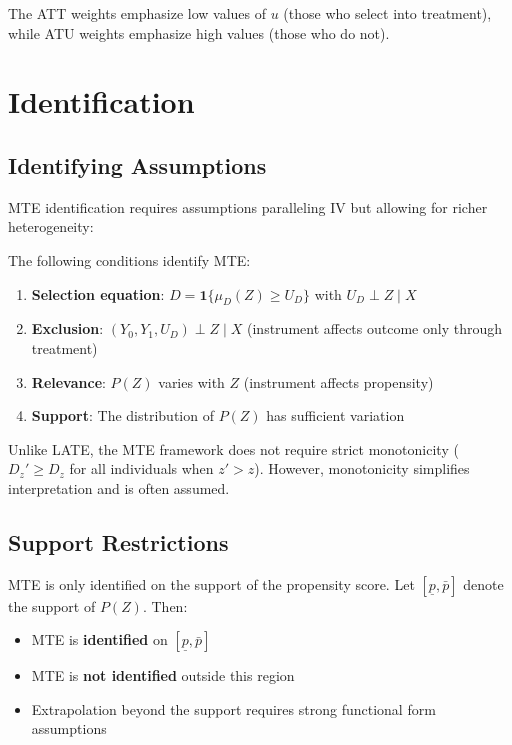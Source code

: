 The ATT weights emphasize low values of $u$ (those who select into treatment), while ATU weights emphasize high values (those who do not).

\section{Identification}
\label{sec:mte-identification}

\subsection{Identifying Assumptions}

MTE identification requires assumptions paralleling IV but allowing for richer heterogeneity:

\begin{assumption}
\label{ass:mte-id}
The following conditions identify MTE:
\begin{enumerate}
\item \textbf{Selection equation}: $D = \mathbf{1}\{\mu_D(Z) \geq U_D\}$ with $U_D \perp Z \mid X$
\item \textbf{Exclusion}: $(Y_0, Y_1, U_D) \perp Z \mid X$ (instrument affects outcome only through treatment)
\item \textbf{Relevance}: $P(Z)$ varies with $Z$ (instrument affects propensity)
\item \textbf{Support}: The distribution of $P(Z)$ has sufficient variation
\end{enumerate}
\end{assumption}

\begin{remark}[Monotonicity]
Unlike LATE, the MTE framework does not require strict monotonicity ($D_z' \geq D_z$ for all individuals when $z' > z$). However, monotonicity simplifies interpretation and is often assumed.
\end{remark}

\subsection{Support Restrictions}

MTE is only identified on the support of the propensity score. Let $[\underline{p}, \bar{p}]$ denote the support of $P(Z)$. Then:

\begin{itemize}
\item MTE is \textbf{identified} on $[\underline{p}, \bar{p}]$
\item MTE is \textbf{not identified} outside this region
\item Extrapolation beyond the support requires strong functional form assumptions
\end{itemize}


